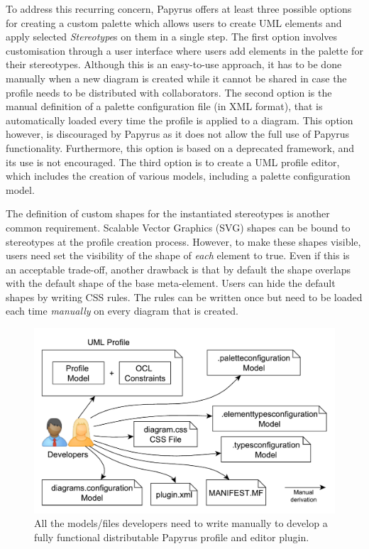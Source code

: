 To address this recurring concern, Papyrus offers at least three possible options for creating a custom palette which allows users to create  UML elements and apply selected \textit{Stereotype}s on them in a single step. 
The first option involves customisation through a user interface where users add elements in the palette for their stereotypes. 
Although this is an easy-to-use approach, it has to be done manually when a new diagram is created while it cannot be shared in case the profile needs to be distributed with collaborators. 
The second option is the manual definition of a palette configuration file (in XML format), that is automatically loaded every time the profile is applied to a diagram. 
This option however, is discouraged by Papyrus as it does not allow the full use of Papyrus functionality.
Furthermore, this option is based on a deprecated framework, and its use is not encouraged. 
The third option is to create a UML profile editor, which includes the creation of various models, including a palette configuration model. 

The definition of custom shapes for the instantiated stereotypes is another common requirement. 
Scalable Vector Graphics (SVG) shapes can be bound to stereotypes at the profile creation process. 
However, to make these shapes visible, users need set the visibility of the shape of \textit{each} element to true. 
Even if this is an acceptable trade-off, another drawback is that by default the shape overlaps with the default shape of the base meta-element. 
Users can hide the default shapes by writing CSS rules. 
The rules can be written once but need to be loaded each time \textit{manually} on every diagram that is created. 
\begin{figure}[t]
	\centering
	\includegraphics[width=1\textwidth]{diagrams/neededPapyrusFiles.pdf}
	\vspace{-3mm}
	\caption[]{All the models/files developers need to write manually to 
	develop a fully functional distributable Papyrus profile and editor plugin.}
	\label{fig:neededPapyrusFiles}
	\vspace*{-3mm}
\end{figure}

